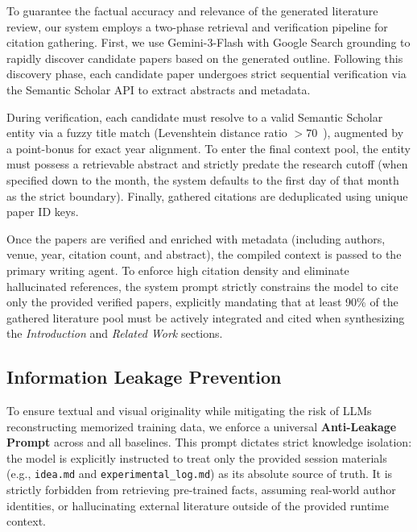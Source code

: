 To guarantee the factual accuracy and relevance of the generated literature review, our system employs a two-phase retrieval and verification pipeline for citation gathering. First, we use Gemini-3-Flash with Google Search grounding to rapidly discover candidate papers based on the generated outline. Following this discovery phase, each candidate paper undergoes strict sequential verification via the Semantic Scholar API to extract abstracts and metadata.

During verification, each candidate must resolve to a valid Semantic Scholar entity via a fuzzy title match (Levenshtein distance ratio $> 70$~\citep{Levenshtein1965BinaryCC}), augmented by a point-bonus for exact year alignment. To enter the final context pool, the entity must possess a retrievable abstract and strictly predate the research cutoff (when specified down to the month, the system defaults to the first day of that month as the strict boundary). Finally, gathered citations are deduplicated using unique paper ID keys.

Once the papers are verified and enriched with metadata (including authors, venue, year, citation count, and abstract), the compiled context is passed to the primary writing agent. To enforce high citation density and eliminate hallucinated references, the system prompt strictly constrains the model to cite only the provided verified papers, explicitly mandating that at least 90\% of the gathered literature pool must be actively integrated and cited when synthesizing the \textit{Introduction} and \textit{Related Work} sections.




\subsection{Information Leakage Prevention}
\label{appendix:info_leakage}

To ensure textual and visual originality while mitigating the risk of LLMs reconstructing memorized training data, we enforce a universal \textbf{Anti-Leakage Prompt} across \ourmethod{} and all baselines. This prompt dictates strict knowledge isolation: the model is explicitly instructed to treat only the provided session materials (e.g., \texttt{idea.md} and \texttt{experimental\_log.md}) as its absolute source of truth. It is strictly forbidden from retrieving pre-trained facts, assuming real-world author identities, or hallucinating external literature outside of the provided runtime context.

